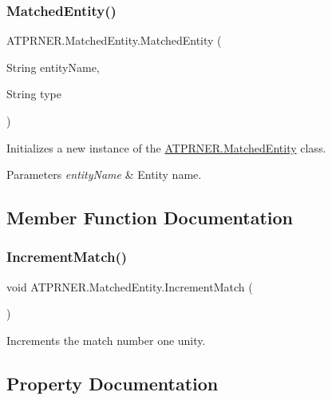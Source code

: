 \subsubsection{\texorpdfstring{Matched\+Entity()}{MatchedEntity()}}
{\footnotesize\ttfamily A\+T\+P\+R\+N\+E\+R.\+Matched\+Entity.\+Matched\+Entity (\begin{DoxyParamCaption}\item[{String}]{entity\+Name,  }\item[{String}]{type }\end{DoxyParamCaption})\hspace{0.3cm}{\ttfamily [inline]}}



Initializes a new instance of the \hyperlink{class_a_t_p_r_n_e_r_1_1_matched_entity}{A\+T\+P\+R\+N\+E\+R.\+Matched\+Entity} class. 


\begin{DoxyParams}{Parameters}
{\em entity\+Name} & Entity name.\\
\hline
\end{DoxyParams}


\subsection{Member Function Documentation}
\hypertarget{class_a_t_p_r_n_e_r_1_1_matched_entity_ae6fa09ea42c0787d4279ceb5076c5f14}{}\label{class_a_t_p_r_n_e_r_1_1_matched_entity_ae6fa09ea42c0787d4279ceb5076c5f14} 
\subsubsection{\texorpdfstring{Increment\+Match()}{IncrementMatch()}}
{\footnotesize\ttfamily void A\+T\+P\+R\+N\+E\+R.\+Matched\+Entity.\+Increment\+Match (\begin{DoxyParamCaption}{ }\end{DoxyParamCaption})\hspace{0.3cm}{\ttfamily [inline]}}



Increments the match number one unity. 



\subsection{Property Documentation}
\hypertarget{class_a_t_p_r_n_e_r_1_1_matched_entity_a42a05257a07b5d089ac070b1d9e5461a}{}\label{class_a_t_p_r_n_e_r_1_1_matched_entity_a42a05257a07b5d089ac070b1d9e5461a} 
